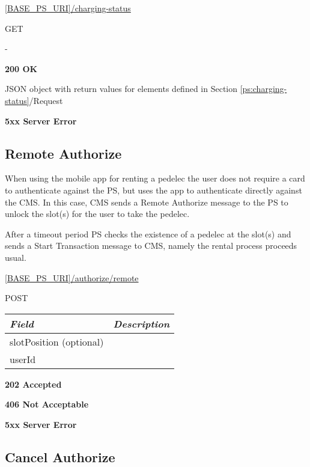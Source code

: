  \url{[BASE_PS_URI]/charging-status}

 GET

 -

 \textbf{200 OK}

JSON object with return values for elements defined in Section \ref{ps:charging-status}/Request

 \textbf{5xx Server Error}

\subsection{Remote Authorize}

When using the mobile app for renting a pedelec the user does not require a card to authenticate against the \acs{PS}, but uses the app to authenticate directly against the \acs{CMS}. In this case, \acs{CMS} sends a Remote Authorize message to the \acs{PS} to unlock the slot(s) for the user to take the pedelec. 

After a timeout period \acs{PS} checks the existence of a pedelec at the slot(s) and sends a Start Transaction message to \acs{CMS}, namely the rental process proceeds usual.


 \url{[BASE_PS_URI]/authorize/remote}

 POST

\begin{table}[!h]
\vspace{-7mm}
\begin{tabularx}{\linewidth}{ | l | X | }
  \hline
  \textit{Field} & \textit{Description} \\
  \hline \hline
  slotPosition (optional) 		&  \\
  userId		&  \\
  \hline
\end{tabularx}
\end{table}

 \textbf{202 Accepted}

 \textbf{406 Not Acceptable}

\textbf{5xx Server Error}

\subsection{Cancel Authorize}

